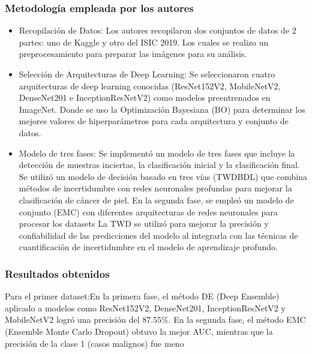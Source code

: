 \subsubsection{Metodología empleada por los autores}
\newcommand{\TUQSone}{Recopilación de Datos: Los autores recopilaron dos conjuntos de datos de 2 partes: uno de Kaggle y otro del ISIC 2019. Los cuales se realizo un preprocesamiento para preparar las imágenes para su análisis.
}

\newcommand{\TUQStwo}{ Selección de Arquitecturas de Deep Learning: Se seleccionaron cuatro arquitecturas de deep learning conocidas (ResNet152V2, MobileNetV2, DenseNet201 e InceptionResNetV2) como modelos preentrenados en ImageNet. Donde se uso la Optimización Bayesiana (BO) para determinar los mejores valores de hiperparámetros para cada arquitectura y conjunto de datos.
 }

\newcommand{\TUQSthree}{Modelo de tres fases: Se implementó un modelo de tres fases que incluye la detección de muestras inciertas, la clasificación inicial y la clasificación final. Se utilizó un modelo de decisión basado en tres vías (TWDBDL) que combina métodos de incertidumbre con redes neuronales profundas para mejorar la clasificación de cáncer de piel. En la segunda fase, se empleó un modelo de conjunto (EMC) con diferentes arquitecturas de redes neuronales para procesar los datasets
La TWD se utilizó para mejorar la precisión y confiabilidad de las predicciones del modelo al integrarla con las técnicas de cuantificación de incertidumbre en el modelo de aprendizaje profundo.
}

\begin{itemize}
	\item \TUQSone
	\item \TUQStwo
	\item \TUQSthree

\end{itemize}



\subsubsection{Resultados obtenidos}
Para el primer dataset:En la primera fase, el método DE (Deep Ensemble) aplicado a modelos como ResNet152V2, DenseNet201, InceptionResNetV2 y MobileNetV2 logró una precisión del 87.55\%. En la segunda fase, el método EMC (Ensemble Monte Carlo Dropout) obtuvo la mejor AUC, mientras que la precisión de la clase 1 (casos malignos) fue meno

